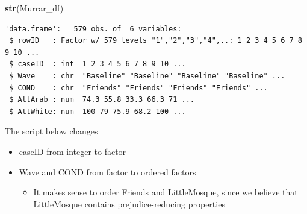 \documentclass[
  11pt,
]{book}
\newenvironment{Shaded}{\begin{snugshade}}{\end{snugshade}}
\newcommand{\AttributeTok}[1]{\textcolor[rgb]{0.27,0.27,0.27}{#1}}
\newcommand{\CommentTok}[1]{\textcolor[rgb]{0.37,0.37,0.37}{\textit{#1}}}
\newcommand{\FunctionTok}[1]{\textcolor[rgb]{0.27,0.27,0.27}{\textbf{#1}}}
\newcommand{\NormalTok}[1]{#1}
\newcommand{\OtherTok}[1]{\textcolor[rgb]{0.37,0.37,0.37}{#1}}
\newcommand{\SpecialCharTok}[1]{\textcolor[rgb]{0.43,0.43,0.43}{\textbf{#1}}}
\newcommand{\StringTok}[1]{\textcolor[rgb]{0.5,0.5,0.5}{#1}}
\providecommand{\tightlist}{%
  \setlength{\itemsep}{0pt}\setlength{\parskip}{0pt}}
\begin{document}
\begin{Shaded}
\begin{Highlighting}[]
\FunctionTok{str}\NormalTok{(Murrar\_df)}
\end{Highlighting}
\end{Shaded}

\begin{verbatim}
'data.frame':   579 obs. of  6 variables:
 $ rowID   : Factor w/ 579 levels "1","2","3","4",..: 1 2 3 4 5 6 7 8 9 10 ...
 $ caseID  : int  1 2 3 4 5 6 7 8 9 10 ...
 $ Wave    : chr  "Baseline" "Baseline" "Baseline" "Baseline" ...
 $ COND    : chr  "Friends" "Friends" "Friends" "Friends" ...
 $ AttArab : num  74.3 55.8 33.3 66.3 71 ...
 $ AttWhite: num  100 79 75.9 68.2 100 ...
\end{verbatim}

The script below changes

\begin{itemize}
\tightlist
\item
  caseID from integer to factor
\item
  Wave and COND from factor to ordered factors

  \begin{itemize}
  \tightlist
  \item
    It makes sense to order Friends and LittleMosque, since we believe that LittleMosque contains prejudice-reducing properties
  \end{itemize}
\end{itemize}

\begin{Shaded}
\end{Shaded}
\end{document}
